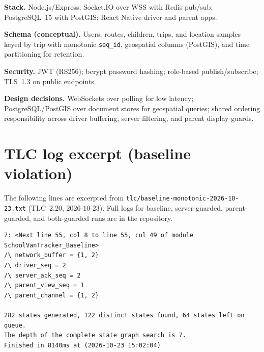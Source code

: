 \documentclass[11pt,a4paper]{article}
\begin{document}
\textbf{Stack.} Node.js/Express; Socket.IO over WSS with Redis pub/sub; PostgreSQL~15 with PostGIS; React Native driver and parent apps.

\textbf{Schema (conceptual).} Users, routes, children, trips, and location samples keyed by trip with monotonic \texttt{seq\_id}, geospatial columns (PostGIS), and time partitioning for retention.

\textbf{Security.} JWT (RS256); bcrypt password hashing; role-based publish/subscribe; TLS~1.3 on public endpoints.

\textbf{Design decisions.} WebSockets over polling for low latency; PostgreSQL/PostGIS over document stores for geospatial queries; shared ordering responsibility across driver buffering, server filtering, and parent display guards.

\section{TLC log excerpt (baseline violation)}
\label{app:logs}

The following lines are excerpted from \texttt{tlc/baseline-monotonic-2026-10-23.txt} (TLC~2.20, 2026-10-23). Full logs for baseline, server-guarded, parent-guarded, and both-guarded runs are in the repository.

\begin{lstlisting}[caption={Excerpt: error state (state 7).}]
7: <Next line 55, col 8 to line 55, col 49 of module SchoolVanTracker_Baseline>
/\ network_buffer = {1, 2}
/\ driver_seq = 2
/\ server_ack_seq = 2
/\ parent_view_seq = 1
/\ parent_channel = {1, 2}

282 states generated, 122 distinct states found, 64 states left on queue.
The depth of the complete state graph search is 7.
Finished in 8140ms at (2026-10-23 15:02:04)
\end{lstlisting}
\end{document}
